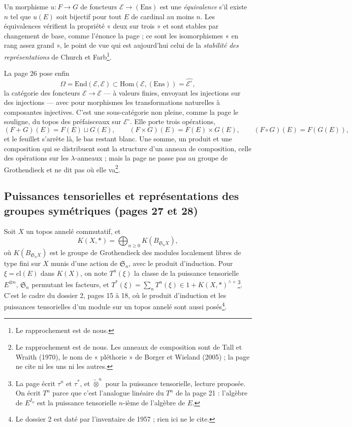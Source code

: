 \documentclass[11pt,a4paper]{article}
\begin{document}
Un morphisme $u \colon F \to G$ de foncteurs $\mathcal{E} \to
(\mathrm{Ens})$ est une \emph{équivalence} s'il existe $n$ tel que $u(E)$ soit
bijectif pour tout $E$ de cardinal au moins $n$. Les équivalences vérifient
la propriété « deux sur trois » et sont stables par changement de base,
comme l'énonce la page ; ce sont les isomorphismes « en rang assez grand »,
le point de vue qui est aujourd'hui celui de la \emph{stabilité des
représentations} de Church et Farb\footnote{Le rapprochement est de
nous.}.

La page 26 pose enfin
\[
\Omega = \mathrm{End}(\mathcal{E}, \mathcal{E})
\subset \mathrm{Hom}(\mathcal{E}, (\mathrm{Ens})) =
\widehat{\mathcal{E}^{\circ}} ,
\]
la catégorie des foncteurs $\mathcal{E} \to \mathcal{E}$ — à valeurs finies,
envoyant les injections sur des injections — avec pour morphismes les
transformations naturelles à composantes injectives. C'est une
sous-catégorie non pleine, comme la page le souligne, du topos des
préfaisceaux sur $\mathcal{E}^{\circ}$. Elle porte trois opérations,
\[
(F + G)(E) = F(E) \sqcup G(E), \qquad (F \times G)(E) = F(E) \times G(E),
\qquad (F \circ G)(E) = F(G(E)),
\]
et le feuillet s'arrête là, le bas restant blanc. Une somme, un produit et
une composition qui se distribuent sont la structure d'un anneau de
composition, celle des opérations sur les $\lambda$-anneaux ; mais la page
ne passe pas au groupe de Grothendieck et ne dit pas où elle
va\footnote{Le rapprochement est de nous. Les anneaux de composition
sont de Tall et Wraith (1970), le nom de « pléthorie » de Borger et Wieland
(2005) ; la page ne cite ni les uns ni les autres.}.

\subsection*{Puissances tensorielles et représentations des groupes symétriques (pages 27 et 28)}

Soit $X$ un topos annelé commutatif, et
\[
K(X, *) = \bigoplus_{n \geqslant 0} K(B_{\mathfrak{S}_n X}),
\]
où $K(B_{\mathfrak{S}_n X})$ est le groupe de Grothendieck des modules
localement libres de type fini sur $X$ munis d'une action de
$\mathfrak{S}_n$, avec le produit d'induction. Pour $\xi = \mathrm{cl}(E)$
dans $K(X)$, on note $T^{n}(\xi)$ la classe de la puissance tensorielle
$E^{\otimes n}$, $\mathfrak{S}_n$ permutant les facteurs, et $T^{*}(\xi) =
\sum_n T^{n}(\xi) \in 1 + K(X, *)^{\wedge +}$\footnote{La page écrit
$\tau^{n}$ et $\tau^{*}$, et $\widetilde{\otimes}^{n}$ pour la puissance
tensorielle, lecture proposée. On écrit $T^{n}$ parce que c'est l'analogue
linéaire du $T^{n}$ de la page 21 : l'algèbre de $E^{I_n}$ est la
puissance tensorielle $n$-ième de l'algèbre de $E$.}. C'est le cadre du
dossier 2, pages 15 à 18, où le produit d'induction et les puissances
tensorielles d'un module sur un topos annelé sont aussi posés\footnote{Le
dossier 2 est daté par l'inventaire de 1957 ; rien ici ne le cite.}.
\end{document}
